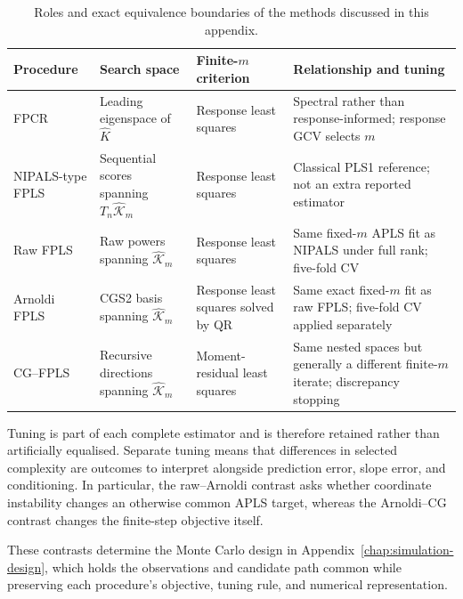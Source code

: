 \begin{table}[!htbp]
    \centering
    \small
    \caption[Roles and equivalence boundaries of the methods]{Roles and exact equivalence boundaries of the methods discussed
    in this appendix.}
    \label{tab:methods-equivalence}
    \begin{tabular}{@{}
        >{\raggedright\arraybackslash}p{2.4cm}
        >{\raggedright\arraybackslash}p{3.0cm}
        >{\raggedright\arraybackslash}p{3.2cm}
        >{\raggedright\arraybackslash}p{4.4cm}@{}}
        \toprule
        Procedure & Search space & Finite-$m$ criterion & Relationship and tuning \\
        \midrule
        FPCR
        & Leading eigenspace of $\widehat K$
        & Response least squares
        & Spectral rather than response-informed; response GCV selects $m$ \\

        NIPALS-type FPLS
        & Sequential scores spanning $T_n\widehat{\mathcal K}_m$
        & Response least squares
        & Classical PLS1 reference; not an extra reported estimator \\

        Raw FPLS
        & Raw powers spanning $\widehat{\mathcal K}_m$
        & Response least squares
        & Same fixed-$m$ APLS fit as NIPALS under full rank; five-fold CV \\

        Arnoldi FPLS
        & CGS2 basis spanning $\widehat{\mathcal K}_m$
        & Response least squares solved by QR
        & Same exact fixed-$m$ fit as raw FPLS; five-fold CV applied separately \\

        CG--FPLS
        & Recursive directions spanning $\widehat{\mathcal K}_m$
        & Moment-residual least squares
        & Same nested spaces but generally a different finite-$m$ iterate;
          discrepancy stopping \\
        \bottomrule
    \end{tabular}
\end{table}

Tuning is part of each complete estimator and is therefore retained rather
than artificially equalised.  Separate tuning means that differences in
selected complexity are outcomes to interpret alongside prediction error,
slope error, and conditioning.  In particular, the raw--Arnoldi contrast asks
whether coordinate instability changes an otherwise common APLS target,
whereas the Arnoldi--CG contrast changes the finite-step objective itself.

These contrasts determine the Monte Carlo design in
Appendix~\ref{chap:simulation-design}, which holds the observations and
candidate path common while preserving each procedure's objective, tuning
rule, and numerical representation.
